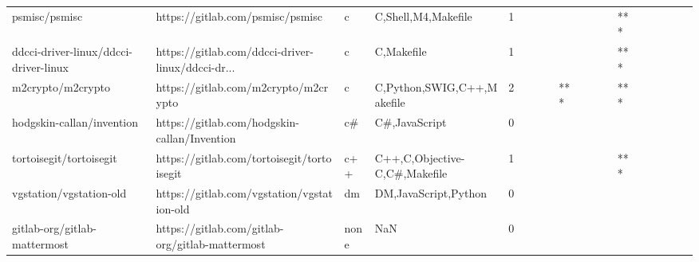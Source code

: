 \begin{tabular}{llllrlllllllllllll}
psmisc/psmisc                                      &                   https://gitlab.com/psmisc/psmisc &                 c &                                C,Shell,M4,Makefile &       1 &         &        &           &                &                 &        &           &       *** &          &          &       &              &          \\
ddcci-driver-linux/ddcci-driver-linux              &  https://gitlab.com/ddcci-driver-linux/ddcci-dr... &                 c &                                         C,Makefile &       1 &         &        &           &                &                 &        &           &       *** &          &          &       &              &          \\
m2crypto/m2crypto                                  &               https://gitlab.com/m2crypto/m2crypto &                 c &                         C,Python,SWIG,C++,Makefile &       2 &         &        &           &            *** &                 &        &           &       *** &          &          &       &              &          \\
hodgskin-callan/invention                          &       https://gitlab.com/hodgskin-callan/Invention &                c\# &                                      C\#,JavaScript &       0 &         &        &           &                &                 &        &           &           &          &          &       &              &          \\
tortoisegit/tortoisegit                            &         https://gitlab.com/tortoisegit/tortoisegit &               c++ &                      C++,C,Objective-C,C\#,Makefile &       1 &         &        &           &                &                 &        &           &       *** &          &          &       &              &          \\
vgstation/vgstation-old                            &         https://gitlab.com/vgstation/vgstation-old &                dm &                               DM,JavaScript,Python &       0 &         &        &           &                &                 &        &           &           &          &          &       &              &          \\
gitlab-org/gitlab-mattermost                       &    https://gitlab.com/gitlab-org/gitlab-mattermost &              none &                                                NaN &       0 &         &        &           &                &                 &        &           &           &          &          &       &              &          \\

\end{tabular}

